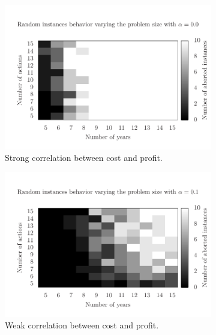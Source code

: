 \begin{figure}[H]
  \begin{subfigure}{0.45\textwidth}
    \includegraphics[scale=0.5, trim=0.75cm 0cm 0 2cm, clip=true]{imgs/very_hard.pdf}
    \caption{Strong correlation between cost and profit.}
    \label{fig:time1}
  \end{subfigure}
  \begin{subfigure}{0.45\textwidth}
    \includegraphics[scale=0.5, trim=0.75cm 0cm 0 2cm, clip=true]{imgs/hard.pdf}
    \caption{Weak correlation between cost and profit. \\ $\,$ }
    \label{fig:time2}
  \end{subfigure}
  \begin{subfigure}{0.45\textwidth}

\end{subfigure}
\end{figure}
